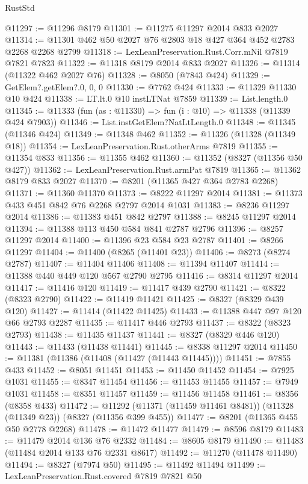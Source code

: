 \begin{lexlean}{RustStd}
\begin{coremodule}
@11297 := @11296 @8179
@11301 := @11275 @11297 @2014 @833 @2027
@11314 := @11301 @462 @50 @2027 @76 @2803 @18 @427 @364 @452 @2783 @2268 @2268 @2799
@11318 := LexLeanPreservation.Rust.Corr.mNil @7819 @7821 @7823
@11322 := @11318 @8179 @2014 @833 @2027
@11326 := @11314 (@11322 @462 @2027 @76)
@11328 := @8050 (@7843 @424)
@11329 := GetElem?.getElem?.{0, 0, 0}
@11330 := @7762 @424
@11333 := @11329 @11330 @10 @424
@11338 := LT.lt.{0} @10 instLTNat @7859
@11339 := List.length.{0}
@11345 := @11333 (fun (as : @11330) => fun (i : @10) => @11338 (@11339 @424 @7903))
@11346 := List.instGetElem?NatLtLength.{0}
@11348 := @11345 (@11346 @424)
@11349 := @11348 @462
@11352 := @11326 (@11328 (@11349 @18))
@11354 := LexLeanPreservation.Rust.otherArms @7819
@11355 := @11354 @833
@11356 := @11355 @462
@11360 := @11352 (@8327 (@11356 @50 @427))
@11362 := LexLeanPreservation.Rust.armPat @7819
@11365 := @11362 @8179 @833 @2027
@11370 := @8201 (@11365 @427 @364 @2783 @2268)
@11371 := @11360 @11370
@11373 := @8222 @11297 @2014
@11381 := @11373 @433 @451 @842 @76 @2268 @2797 @2014 @1031
@11383 := @8236 @11297 @2014
@11386 := @11383 @451 @842 @2797
@11388 := @8245 @11297 @2014
@11394 := @11388 @113 @450 @584 @841 @2787 @2796
@11396 := @8257 @11297 @2014
@11400 := @11396 @23 @584 @23 @2787
@11401 := @8266 @11297
@11404 := @11400 (@8265 (@11401 @23))
@11406 := @8273 (@8274 @2787)
@11407 := @11404 @11406
@11408 := @11394 @11407
@11414 := @11388 @440 @449 @120 @567 @2790 @2795
@11416 := @8314 @11297 @2014
@11417 := @11416 @120
@11419 := @11417 @439 @2790
@11421 := @8322 (@8323 @2790)
@11422 := @11419 @11421
@11425 := @8327 (@8329 @439 @120)
@11427 := @11414 (@11422 @11425)
@11433 := @11388 @447 @97 @120 @66 @2793 @2287
@11435 := @11417 @446 @2793
@11437 := @8322 (@8323 @2793)
@11438 := @11435 @11437
@11441 := @8327 (@8329 @446 @120)
@11443 := @11433 (@11438 @11441)
@11445 := @8338 @11297 @2014
@11450 := @11381 (@11386 (@11408 (@11427 (@11443 @11445))))
@11451 := @7855 @433
@11452 := @8051 @11451
@11453 := @11450 @11452
@11454 := @7925 @1031
@11455 := @8347 @11454
@11456 := @11453 @11455
@11457 := @7949 @1031
@11458 := @8351 @11457
@11459 := @11456 @11458
@11461 := @8356 (@8358 @433)
@11472 := @11292 (@11371 (@11459 @11461 @8481)) (@11328 (@11349 @23)) (@8327 (@11356 @399 @455))
@11477 := @8201 (@11365 @455 @50 @2778 @2268)
@11478 := @11472 @11477
@11479 := @8596 @8179
@11483 := @11479 @2014 @136 @76 @2332
@11484 := @8605 @8179
@11490 := @11483 (@11484 @2014 @133 @76 @2331 @8617)
@11492 := @11270 (@11478 @11490)
@11494 := @8327 (@7974 @50)
@11495 := @11492 @11494
@11499 := LexLeanPreservation.Rust.covered @7819 @7821 @50

\end{coremodule}
\end{lexlean}
